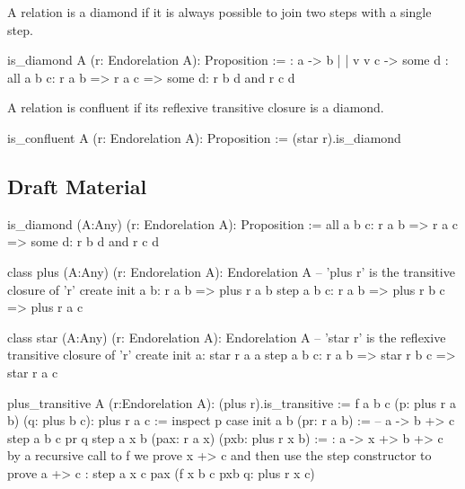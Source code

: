 A relation is a diamond if it is always possible to join two steps with a
single step.

\begin{alba}
  is_diamond A (r: Endorelation A): Proposition :=
      {:   a  ->  b
           |      |
           v      v
           c  -> some d :}
    all a b c:
      r a b
      => r a c
      => some d: r b d and r c d
\end{alba}


A relation is confluent if its reflexive transitive closure is a diamond.

\begin{alba}
  is_confluent A (r: Endorelation A): Proposition :=
    (star r).is_diamond
\end{alba}







\subsection{Draft Material}


\begin{alba}
  is_diamond (A:Any) (r: Endorelation A): Proposition :=
    all a b c: r a b => r a c => some d: r b d and r c d

  class
    plus (A:Any) (r: Endorelation A): Endorelation A
      -- 'plus r' is the transitive closure of 'r'
  create
    init a b: r a b => plus r a b
    step a b c: r a b => plus r b c => plus r a c

  class
    star (A:Any) (r: Endorelation A): Endorelation A
      -- 'star r' is the reflexive transitive closure of 'r'
  create
    init a: star r a a
    step a b c: r a b => star r b c => star r a c
\end{alba}







\begin{alba}
  plus_transitive A (r:Endorelation A): (plus r).is_transitive :=
    f a b c (p: plus r a b) (q: plus b c): plus r a c :=
      inspect
        p
      case
        init a b (pr: r a b) :=
            -- a -> b +> c
          step a b c pr q
        step a x b (pax: r a x) (pxb: plus r x b) :=
            {: a -> x +> b +> c
               by a recursive call to f we prove x +> c
               and then use the step constructor to prove a +> c :}
          step a x c pax (f x b c pxb q: plus r x c)
\end{alba}











